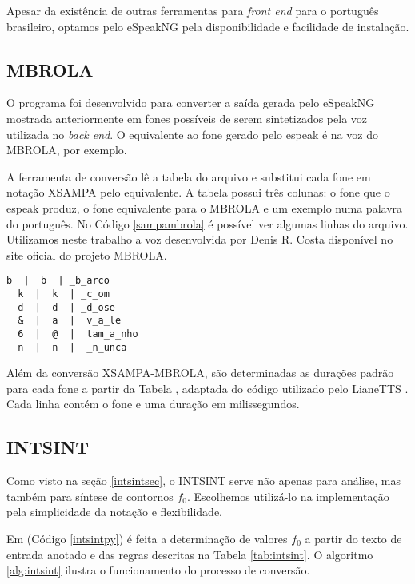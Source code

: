 Apesar da existência de outras ferramentas para \emph{front end} para o
português brasileiro, optamos pelo eSpeakNG pela disponibilidade e facilidade de
instalação.


\subsection{MBROLA}
O programa  foi desenvolvido para converter a saída gerada
pelo eSpeakNG mostrada anteriormente em fones possíveis de serem sintetizados
pela voz utilizada no \emph{back end}. O equivalente ao fone \code{/&/} gerado
pelo espeak é  na voz do MBROLA, por exemplo.

A ferramenta de conversão lê a tabela do arquivo  e
substitui cada fone em notação XSAMPA pelo equivalente. A tabela possui três
colunas: o fone que o espeak produz, o fone equivalente para o MBROLA e um
exemplo numa palavra do português. No Código \ref{sampambrola} é possível ver
algumas linhas do arquivo. Utilizamos neste trabalho a voz 
desenvolvida por Denis R. Costa disponível no site oficial do projeto MBROLA.

\begin{lstlisting}[caption=Extrato de linhas da tabela de conversão, label=sampambrola]
  b  |  b  | _b_arco
  k  |  k  | _c_om
  d  |  d  | _d_ose
  &  |  a  |  v_a_le
  6  |  @  |  tam_a_nho
  n  |  n  |  _n_unca
\end{lstlisting}

Além da conversão XSAMPA-MBROLA, são determinadas as durações padrão para cada
fone a partir da Tabela , adaptada do código utilizado pelo
LianeTTS \cite{lianetts}. Cada linha contém o fone e uma duração em milissegundos.

\subsection{INTSINT}
\label{intsintrules}
Como visto na seção \ref{intsintsec}, o INTSINT serve não apenas para análise,
mas também para síntese de contornos $ f_0 $. Escolhemos utilizá-lo na implementação
pela simplicidade da notação e flexibilidade.

Em  (Código \ref{intsintpy}) é feita a determinação de valores $ f_0 $ a partir do texto de
entrada anotado e das regras descritas na Tabela \ref{tab:intsint}. O
algoritmo \ref{alg:intsint} ilustra o funcionamento do processo de conversão.


